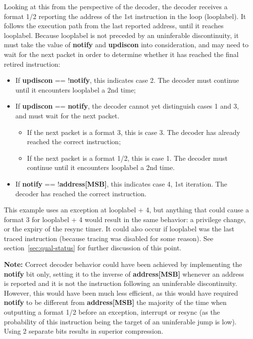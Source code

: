 Looking at this from the perspective of the decoder, the decoder receives a format 1/2 reporting the address of the 1st instruction in the 
loop (looplabel).  It follows the execution path from the last reported address, until it reaches looplabel.  Because looplabel is not 
preceded by an uninferable discontinuity, it must take the value of \textbf{notify} and \textbf{updiscon} into consideration, and may need 
to wait for the next packet in order to determine whether it has reached the final retired instruction:
\begin{itemize}
  \item If \textbf{updiscon} == !\textbf{notify}, this indicates case 2.  The decoder must continue until it encounters 
    looplabel a 2nd time;
  \item If \textbf{updiscon} == \textbf{notify}, the decoder cannot yet distinguish cases 1 and 3, and must wait for the 
    next packet.
    \begin{itemize}
      \item If the next packet is a format 3, this is case 3.  The decoder has already reached the correct instruction;
      \item If the next packet is a format 1/2, this is case 1.  The decoder must continue until it encounters 
        looplabel a 2nd time.
    \end{itemize}
  \item If \textbf{notify} == !\textbf{address[MSB]}, this indicates case 4, 1st iteration.  The decoder has reached the 
    correct instruction.
\end{itemize}

This example uses an exception at looplabel + 4, but anything that could cause a format 3 for looplabel + 4 would result in 
the same behavior: a privilege change, or the expiry of the resync timer.  It could also occur if looplabel was the last
traced instruction (because tracing was disabled for some reason).  See section~\ref{sec:qual-status} for further discussion 
of this point.

\textbf{Note:} Correct decoder behavior could have been achieved by implementing the \textbf{notify} bit only, setting it 
to the inverse of \textbf{address[MSB]} whenever an address is reported and it is not the instruction following an 
uninferable discontinuity.  However, this would have been much less efficient, as this would have required \textbf{notify} 
to be different from \textbf{address[MSB]} the majority of the time when outputting a format 1/2 before an exception,
interrupt or resync (as the probability of this instruction being the target of an uninferable jump is low).  Using 2 
separate bits results in superior compression.

